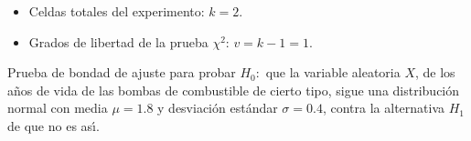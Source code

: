 \begin{solucion}
\begin{datos}
\begin{itemize}
\begin{center}
   \end{center}
   \item Celdas totales del experimento: $k=2$.
   \item Grados de libertad de la prueba $\chi^2$: $v= k-1 = 1$.
  \end{itemize}
 \end{datos}
 
 \begin{hipotesis}
  Prueba de bondad de ajuste para probar $H_0:$
  que la variable aleatoria $X$, de los a\~nos de vida de las bombas
  de combustible de cierto tipo, sigue una distribuci\'on normal
  con media $\mu=1.8$ y desviaci\'on est\'andar $\sigma = 0.4$,
  contra la alternativa $H_1$ de que no es as\'{\i}.
 \end{hipotesis}


\end{solucion}

